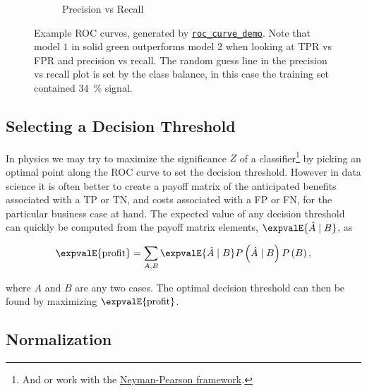 \begin{figure}[H]
\begin{subfigure}[c]{0.48\textwidth}
  \caption{Precision vs Recall}
  \label{fig:ml:roc:precision_recall}
  \end{subfigure}
\caption{
Example ROC curves, generated by \texttt{\href{http://github.com/mepland/roc_curve_demo}{roc\_curve\_demo}}.
Note that model $1$ in solid green outperforms model $2$ when looking at TPR vs FPR and precision vs recall.
The random guess line in the precision vs recall plot is set by the class balance,
in this case the training set contained \SI{34}{\percent} signal.
}
\label{fig:ml:roc}
\end{figure}

\subsection{Selecting a Decision Threshold}
\label{additional:ml:general:eval:decision_threshold}


In physics we may try to maximize the significance $Z$ of a classifier\footnote{And or
work with the \href{https://en.wikipedia.org/wiki/Neyman\%E2\%80\%93Pearson\_lemma}{Neyman-Pearson framework}.} by
picking an optimal point along the ROC curve to set the decision threshold.
However in data science it is often better to create a payoff matrix of the anticipated
benefits associated with a TP or TN, and costs associated with a FP or FN,
for the particular business case at hand.
The expected value of any decision threshold can quickly be computed
from the payoff matrix elements, $\expvalE{\hat{A} \mid B}$, as

\begin{equation} \label{eq:E_profit}
\expvalE{\text{profit}} = \sum_{A,B} \expvalE{\hat{A} \mid B} P\left(\hat{A} \mid B \right) P\left(B\right),
\end{equation}

\noindent where $A$ and $B$ are any two cases.
The optimal decision threshold can then be found by maximizing $\expvalE{\text{profit}}$.

\subsection{Normalization}
\label{additional:ml:general:normalization}

